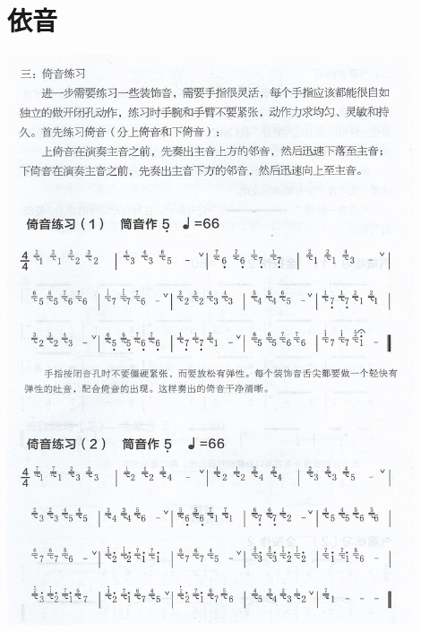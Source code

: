 \documentclass[cn,pad,twocol]{elegantbook}
\begin{document}
\section{依音}                  \includegraphics[width=0.9\textwidth]{dongxiao/Scan 9.jpeg}
\end{document}
